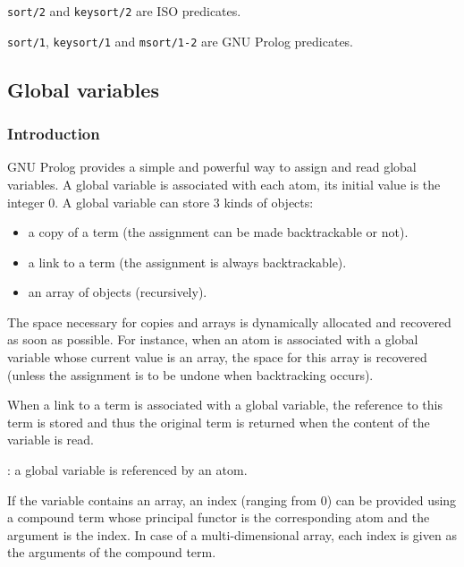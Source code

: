\Portability

\texttt{sort/2} and \texttt{keysort/2} are ISO predicates.

\texttt{sort/1}, \texttt{keysort/1} and \texttt{msort/1-2} are GNU Prolog predicates.


\subsection{Global variables}

\subsubsection{Introduction}
\label{Global-variables}

GNU Prolog provides a simple and powerful way to assign and read global
variables. A global variable is associated with each atom, its initial value is
the integer 0. A global variable can store 3 kinds of objects:

\begin{itemize}

\item a copy of a term (the assignment can be made backtrackable or not).

\item a link to a term (the assignment is always backtrackable).

\item an array of objects (recursively).

\end{itemize}

The space necessary for copies and arrays is dynamically allocated and
recovered as soon as possible. For instance, when an atom is associated with a
global variable whose current value is an array, the space for this array is
recovered (unless the assignment is to be undone when backtracking occurs).

When a link to a term is associated with a global variable, the reference to
this term is stored and thus the original term is returned when the content
of the variable is read.

: a global variable is referenced
by an atom.

If the variable contains an array, an index (ranging from 0) can be provided
using a compound term whose principal functor is the corresponding atom and
the argument is the index. In case of a multi-dimensional array, each index
is given as the arguments of the compound term.

